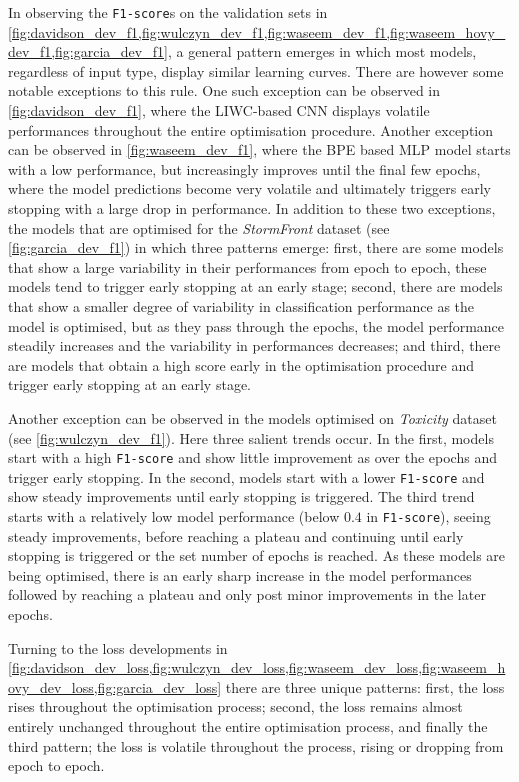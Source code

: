 In observing the \texttt{F1-score}s on the validation sets in \cref{fig:davidson_dev_f1,fig:wulczyn_dev_f1,fig:waseem_dev_f1,fig:waseem_hovy_dev_f1,fig:garcia_dev_f1}, a general pattern emerges in which most models, regardless of input type, display similar learning curves.
There are however some notable exceptions to this rule. 
One such exception can be observed in \cref{fig:davidson_dev_f1}, where the LIWC-based CNN displays volatile performances throughout the entire optimisation procedure.
Another exception can be observed in \cref{fig:waseem_dev_f1}, where the BPE based MLP model starts with a low performance, but increasingly improves until the final few epochs, where the model predictions become very volatile and ultimately triggers early stopping with a large drop in performance.
In addition to these two exceptions, the models that are optimised for the \textit{StormFront} dataset (see \cref{fig:garcia_dev_f1})  in which three patterns emerge: first, there are some models that show a large variability in their performances from epoch to epoch, these models tend to trigger early stopping at an early stage; second, there are models that show a smaller degree of variability in classification performance as the model is optimised, but as they pass through the epochs, the model performance steadily increases and the variability in performances decreases; and third, there are models that obtain a high score early in the optimisation procedure and trigger early stopping at an early stage.

Another exception can be observed in the models optimised on \textit{Toxicity} dataset (see \cref{fig:wulczyn_dev_f1}).
Here three salient trends occur.
In the first, models start with a high \texttt{F1-score} and show little improvement as over the epochs and trigger early stopping.
In the second, models start with a lower \texttt{F1-score} and show steady improvements until early stopping is triggered.
The third trend starts with a relatively low model performance (below $0.4$ in \texttt{F1-score}), seeing steady improvements, before reaching a plateau and continuing until early stopping is triggered or the set number of epochs is reached.
As these models are being optimised, there is an early sharp increase in the model performances followed by reaching a plateau and only post minor improvements in the later epochs.

Turning to the loss developments in \cref{fig:davidson_dev_loss,fig:wulczyn_dev_loss,fig:waseem_dev_loss,fig:waseem_hovy_dev_loss,fig:garcia_dev_loss} there are three unique patterns: first, the loss rises throughout the optimisation process; second, the loss remains almost entirely unchanged throughout the entire optimisation process, and finally the third pattern; the loss is volatile throughout the process, rising or dropping from epoch to epoch.


